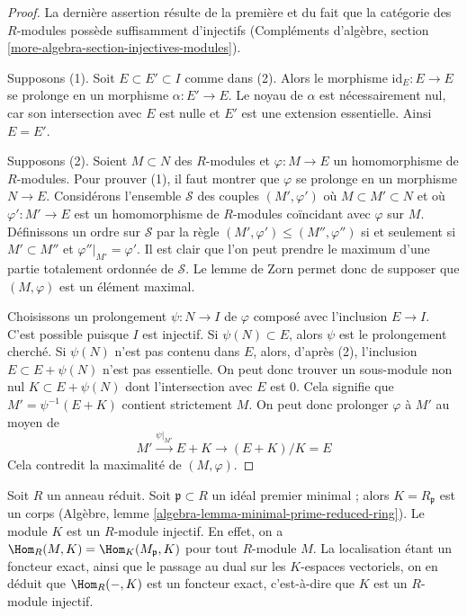 \begin{proof}
La dernière assertion résulte de la première et du fait que la catégorie
des $R$-modules possède suffisamment d'injectifs
(Compléments d'algèbre, section \ref{more-algebra-section-injectives-modules}).

\medskip\noindent
Supposons (1). Soit $E \subset E' \subset I$ comme dans (2).
Alors le morphisme $\text{id}_E : E \to E$ se prolonge en un morphisme $\alpha : E' \to E$.
Le noyau de $\alpha$ est nécessairement nul, car son intersection avec
$E$ est nulle et $E'$ est une extension essentielle. Ainsi $E = E'$.

\medskip\noindent
Supposons (2). Soient $M \subset N$ des $R$-modules et $\varphi : M \to E$
un homomorphisme de $R$-modules. Pour prouver (1), il faut montrer que
$\varphi$ se prolonge en un morphisme $N \to E$. Considérons l'ensemble $\mathcal{S}$
des couples $(M', \varphi')$ où $M \subset M' \subset N$ et où $\varphi' : M' \to E$
est un homomorphisme de $R$-modules coïncidant avec $\varphi$ sur $M$.
Définissons un ordre sur $\mathcal{S}$ par la règle $(M', \varphi') \leq (M'', \varphi'')$
si et seulement si $M' \subset M''$ et $\varphi''|_{M'} = \varphi'$.
Il est clair que l'on peut prendre le maximum d'une partie totalement
ordonnée de $\mathcal{S}$. Le lemme de Zorn permet donc de supposer que $(M, \varphi)$
est un élément maximal.

\medskip\noindent
Choisissons un prolongement $\psi : N \to I$ de $\varphi$ composé avec l'inclusion $E \to I$.
C'est possible puisque $I$ est injectif.
Si $\psi(N) \subset E$, alors $\psi$ est le prolongement cherché.
Si $\psi(N)$ n'est pas contenu dans $E$, alors, d'après (2), l'inclusion
$E \subset E + \psi(N)$ n'est pas essentielle. On peut donc trouver un sous-module non nul
$K \subset E + \psi(N)$ dont l'intersection avec $E$ est $0$.
Cela signifie que $M' = \psi^{-1}(E + K)$ contient strictement $M$.
On peut donc prolonger $\varphi$ à $M'$ au moyen de
$$
M' \xrightarrow{\psi|_{M'}} E + K \to (E + K)/K = E
$$
Cela contredit la maximalité de $(M, \varphi)$.
\end{proof}

\begin{example}
\label{example-reduced-ring-injective}
Soit $R$ un anneau réduit. Soit $\mathfrak p \subset R$ un idéal premier minimal ;
alors $K = R_\mathfrak p$ est un corps
(Algèbre, lemme \ref{algebra-lemma-minimal-prime-reduced-ring}).
Le module $K$ est un $R$-module injectif. En effet, on a
$\Hom_R(M, K) = \Hom_K(M_\mathfrak p, K)$ pour tout $R$-module $M$.
La localisation étant un foncteur exact, ainsi que le passage au dual
sur les $K$-espaces vectoriels, on en déduit que $\Hom_R(-, K)$
est un foncteur exact, c'est-à-dire que $K$ est un $R$-module injectif.
\end{example}

